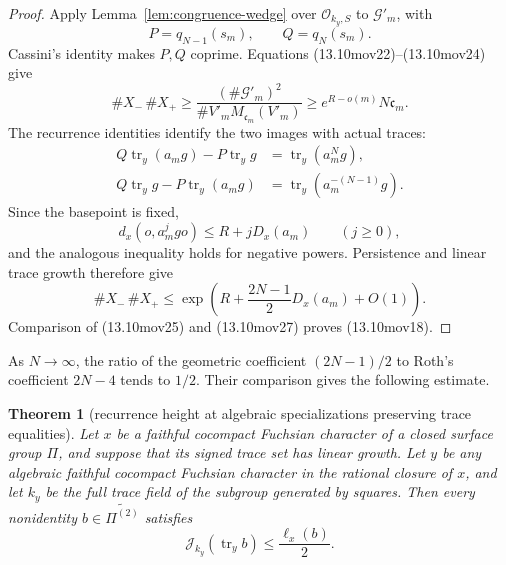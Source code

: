 \documentclass[11pt,reqno]{amsart}
\newtheorem{theorem}{Theorem}[section]
\theoremstyle{definition}
\theoremstyle{remark}
\newcommand{\cO}{\mathcal O}
\newcommand{\Tr}{\operatorname{tr}}
\begin{document}
\begin{proof}
Apply Lemma~\ref{lem:congruence-wedge} over \(\cO_{k_y,S}\) to
\(\mathcal G'_m\), with
\[
 P=q_{N-1}(s_m),\qquad Q=q_N(s_m).
\]
Cassini's identity makes \(P,Q\) coprime.  Equations
(13.10mov22)--(13.10mov24) give
\[
 \#X_-\,\#X_+
 \ge\frac{(\#\mathcal G'_m)^2}
          {\#V'_mM_{\mathfrak c_m}(V'_m)}
 \ge e^{R-o(m)}N\mathfrak c_m.
\tag{13.10mov25}
\]
The recurrence identities identify the two images with actual traces:
\[
 \begin{aligned}
 Q\Tr_y(a_mg)-P\Tr_yg&=\Tr_y(a_m^Ng),\\
 Q\Tr_yg-P\Tr_y(a_mg)&=\Tr_y(a_m^{-(N-1)}g).
 \end{aligned}
\tag{13.10mov26}
\]
Since the basepoint is fixed,
\[
 d_x(o,a_m^jgo)\le R+jD_x(a_m)\qquad(j\ge0),
\]
and the analogous inequality holds for negative powers.  Persistence and
linear trace growth therefore give
\[
 \#X_-\,\#X_+
 \le
 \exp\left(R+\frac{2N-1}{2}D_x(a_m)+O(1)\right).
\tag{13.10mov27}
\]
Comparison of (13.10mov25) and (13.10mov27) proves
(13.10mov18).
\end{proof}

As \(N\to\infty\), the ratio of the geometric coefficient
\((2N-1)/2\) to Roth's coefficient \(2N-4\) tends to \(1/2\).
Their comparison gives the following estimate.

\begin{theorem}[recurrence height at algebraic specializations preserving trace equalities]
\label{thm:persistent-local-expansion-bound}
Let \(x\) be a faithful cocompact Fuchsian character of a closed surface
group \(\Pi\), and suppose that its signed trace set has linear growth.
Let \(y\) be any algebraic faithful cocompact Fuchsian character in the
rational closure of \(x\), and let \(k_y\) be the full trace field of the
subgroup generated by squares.  Then every nonidentity
\(b\in\widetilde{\Pi^{(2)}}\) satisfies
\[
 \mathcal J_{k_y}(\Tr_yb)\le\frac{\ell_x(b)}2.
\tag{13.10mov28}
\]
\end{theorem}
\end{document}
